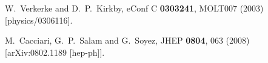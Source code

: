   W.~Verkerke and D.~P.~Kirkby,
  eConf C {\bf 0303241}, MOLT007 (2003)
  [physics/0306116].

  M.~Cacciari, G.~P.~Salam and G.~Soyez,
  JHEP {\bf 0804}, 063 (2008)
  [arXiv:0802.1189 [hep-ph]].
